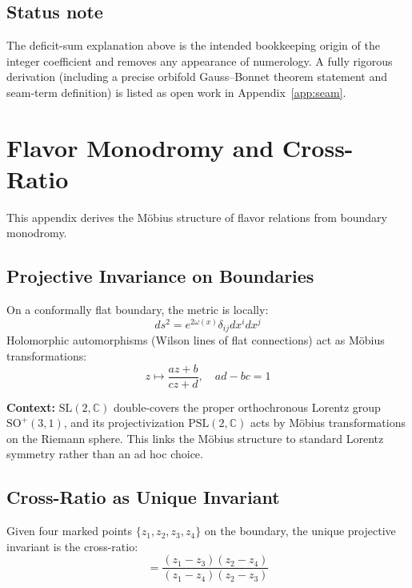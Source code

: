 \subsection{Status note}
The deficit-sum explanation above is the intended bookkeeping origin of the integer coefficient and removes any appearance of numerology.
A fully rigorous derivation (including a precise orbifold Gauss--Bonnet theorem statement and seam-term definition) is listed as open work in Appendix~\ref{app:seam}.

\section{Flavor Monodromy and Cross-Ratio}
\label{app:flavor}

This appendix derives the M\"obius structure of flavor relations from boundary monodromy.

\subsection{Projective Invariance on Boundaries}

On a conformally flat boundary, the metric is locally:
\begin{equation}
    ds^2 = e^{2\omega(x)} \delta_{ij} dx^i dx^j
\end{equation}
Holomorphic automorphisms (Wilson lines of flat connections) act as M\"obius 
transformations:
\begin{equation}
    z \mapsto \frac{az + b}{cz + d}, \quad ad - bc = 1
\end{equation}

\begin{remark}
\textbf{Context:} $\mathrm{SL}(2,\mathbb{C})$ double-covers the proper orthochronous Lorentz group $\mathrm{SO}^+(3,1)$, 
and its projectivization $\mathrm{PSL}(2,\mathbb{C})$ acts by M\"obius transformations on the Riemann sphere. 
This links the M\"obius structure to standard Lorentz symmetry rather than an ad hoc choice.
\end{remark}

\subsection{Cross-Ratio as Unique Invariant}

Given four marked points $\{z_1, z_2, z_3, z_4\}$ on the boundary, the unique 
projective invariant is the cross-ratio:
\begin{equation}
    [z_1, z_2; z_3, z_4] = \frac{(z_1 - z_3)(z_2 - z_4)}{(z_1 - z_4)(z_2 - z_3)}
\end{equation}

